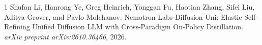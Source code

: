 \documentclass[11pt,a4paper]{article}
\begin{document}

\begin{thebibliography}{1}
Shufan Li, Hanrong Ye, Greg Heinrich, Yonggan Fu, Haotian Zhang, Sifei Liu, Aditya Grover, and Pavlo Molchanov.
\newblock Nemotron-Labs-Diffusion-Uni: Elastic Self-Refining Unified Diffusion LLM with Cross-Paradigm On-Policy Distillation.
\newblock \emph{arXiv preprint arXiv:2610.36466}, 2026.
\end{thebibliography}
\end{document}

